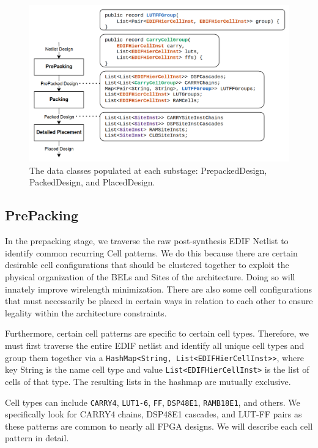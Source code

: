 \documentclass[twocolumn]{article}
\begin{document}
    \begin{figure}[t]
        \centering
        \includegraphics[width=14.0cm]{figures/substages.png}
        \caption{The data classes populated at each substage: PrepackedDesign, PackedDesign, and PlacedDesign.}
        \label{fig:substages}
    \end{figure}

    \subsection{PrePacking}
        In the prepacking stage, we traverse the raw post-synthesis EDIF Netlist to identify common recurring Cell patterns. 
        We do this because there are certain desirable cell configurations that should be clustered together to exploit the physical organization of the BELs and Sites of the architecture. 
        Doing so will innately improve wirelength minimization. 
        There are also some cell configurations that must necessarily be placed in certain ways in relation to each other to ensure legality within the architecture constraints. 

        Furthermore, certain cell patterns are specific to certain cell types. 
        Therefore, we must first traverse the entire EDIF netlist and identify all unique cell types and group them together via a {\tt HashMap<String, List<EDIFHierCellInst>>}, where key String is the name cell type and value {\tt List<EDIFHierCellInst>} is the list of cells of that type. 
        The resulting lists in the hashmap are mutually exclusive. 

        Cell types can include {\tt CARRY4}, {\tt LUT1-6}, {\tt FF}, {\tt DSP48E1}, {\tt RAMB18E1}, and others. 
        We specifically look for CARRY4 chains, DSP48E1 cascades, and LUT-FF pairs as these patterns are common to nearly all FPGA designs. 
        We will describe each cell pattern in detail. 
\end{document}
